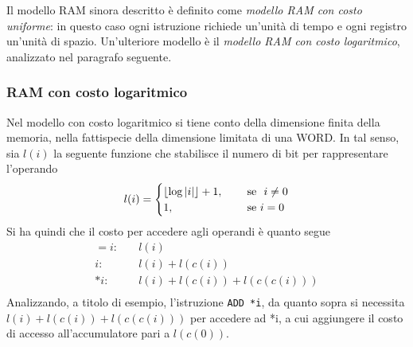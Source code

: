 \documentclass{subfiles}
\begin{document}
Il modello RAM sinora descritto è definito come \emph{modello RAM con costo uniforme}: in questo caso ogni istruzione richiede un'unità di tempo e ogni registro un'unità di spazio.
Un'ulteriore modello è il \emph{modello RAM con costo logaritmico}, analizzato nel paragrafo seguente.

\subsubsection{RAM con costo logaritmico}
Nel modello con costo logaritmico si tiene conto della dimensione finita della memoria, nella fattispecie della dimensione limitata di una WORD.
In tal senso, sia \(l(i)\) la seguente funzione che stabilisce il numero di bit per rappresentare l'operando
\[
    l(i) = \begin{cases}
        \floor{\log \abs{i}} + 1, \quad & \text{se } i \neq 0 \\
        1, \quad                        & \text{se} i = 0     \\
    \end{cases}
\]
Si ha quindi che il costo per accedere agli operandi è quanto segue
\[\begin{aligned}
        =i: & \quad  l(i)                       \\
        i:  & \quad l(i) + l(c(i))              \\
        *i: & \quad l(i) + l(c(i)) + l(c(c(i))) \\
    \end{aligned}\]
\noindent Analizzando, a titolo di esempio, l'istruzione \lstinline[language = RAM]{ADD *i}, da quanto sopra si necessita \(l(i) + l(c(i)) + l(c(c(i)))\) per accedere ad *i,
a cui aggiungere il costo di accesso all'accumulatore pari a \(l(c(0))\).
\end{document}
